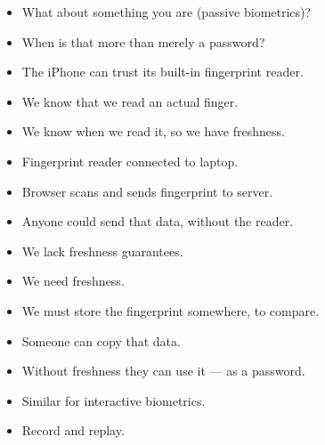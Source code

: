 \begin{frame}
  \begin{exercise}
    \begin{itemize}
      \item What about something you are (passive biometrics)?
      \item When is that more than merely a password?
    \end{itemize}
  \end{exercise}
\end{frame}

\begin{frame}
  \begin{example}
    \begin{itemize}
      \item The iPhone can trust its built-in fingerprint reader.
      \item We know that we read an actual finger.
      \item We know when we read it, so we have freshness.
    \end{itemize}
  \end{example}

  \pause{}

  \begin{example}
    \begin{itemize}
      \item Fingerprint reader connected to laptop.
      \item Browser scans and sends fingerprint to server.
      \item Anyone could send that data, without the reader.
      \item We lack freshness guarantees.
    \end{itemize}
  \end{example}
\end{frame}

\begin{frame}
  \begin{remark}
    \begin{itemize}
      \item We need freshness.
      \item We must store the fingerprint somewhere, to compare.
      \item Someone can copy that data.
      \item Without freshness they can use it --- as a password.
    \end{itemize}
  \end{remark}

  \pause{}

  \begin{remark}
    \begin{itemize}
      \item Similar for interactive biometrics.
      \item Record and replay.
    \end{itemize}
  \end{remark}
\end{frame}

